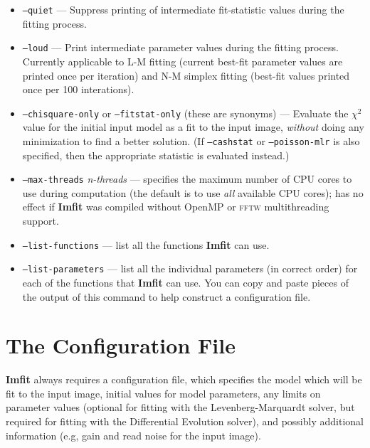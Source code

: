 \documentclass[10pt,a4paper,article]{memoir}
\newcommand{\imfit}{\textbf{Imfit}}
\newcommand{\Imfit}{\textbf{Imfit}}
\newcommand{\chisquare}{\ensuremath{\chi^{2}}}
\begin{document}
\begin{itemize}
\bigskip

\item \texttt{--quiet} --- Suppress printing of intermediate fit-statistic values
during the fitting process.

\item \texttt{--loud} --- Print intermediate parameter values during the fitting
process. Currently applicable to L-M fitting (current best-fit parameter values are
printed once per iteration) and N-M simplex fitting (best-fit values printed once per 100 interations).

\bigskip

\item \texttt{--chisquare-only} or \texttt{--fitstat-only} (these are
synonyms) --- Evaluate the \chisquare{} value for the initial input
model as a fit to the input image, \textit{without} doing any
minimization to find a better solution. (If \texttt{--cashstat} or
\texttt{--poisson-mlr} is also specified, then the appropriate 
statistic is evaluated instead.)

\bigskip

\item \texttt{--max-threads} \textit{n-threads} --- specifies the maximum number of CPU cores to use
during computation (the default is to use \textit{all} available CPU cores); has no
effect if \imfit{} was compiled without OpenMP or \textsc{fftw} multithreading support.

\bigskip

\item \texttt{--list-functions} --- list all the functions \imfit{} can use.

\item \texttt{--list-parameters} --- list all the individual parameters (in correct order)
for each of the functions that \imfit{} can use. You can copy and paste pieces of the output
of this command to help construct a configuration file.
\end{itemize}




\chapter{The Configuration File}\label{sec:configfile}

\Imfit{} always requires a configuration file, which specifies the model
which will be fit to the input image, initial values for model parameters, any
limits on parameter values (optional for fitting with the Levenberg-Marquardt
solver, but required for fitting with the Differential Evolution solver), and
possibly additional information (e.g, gain and read noise for the input image).
\end{document}
